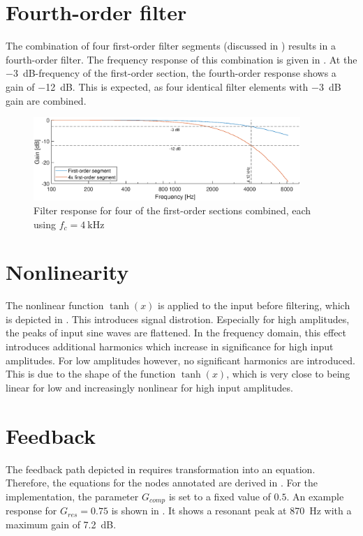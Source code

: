 \documentclass[a4paper, 12pt]{article}
\begin{document}
\section{Fourth-order filter} \label{sec:fourth-order}
The combination of four first-order filter segments (discussed in ) results in a fourth-order filter. The frequency response of this combination is given in . At the \SI{-3}{\deci\bel}-frequency of the first-order section, the fourth-order response shows a gain of \SI{-12}{\deci\bel}. This is expected, as four identical filter elements with \SI{-3}{\deci\bel} gain are combined.

\begin{figure}[!h]
	\centering
	\includegraphics[width=0.9\textwidth]{fourthorder-response.eps}
	\caption{Filter response for four of the first-order sections combined, each using $f_c = \SI{4}{\kilo\hertz}$}
	\label{fig:fourth-order-resp}
\end{figure}

\section{Nonlinearity}
The nonlinear function $\tanh(x)$ is applied \cite{Huovilainen2004} to the input before filtering, which is depicted in . This introduces signal distrotion. Especially for high amplitudes, the peaks of input sine waves are flattened. In the frequency domain, this effect introduces additional harmonics which increase in significance for high input amplitudes. For low amplitudes however, no significant harmonics are introduced. This is due to the shape of the function $\tanh(x)$, which is very close to being linear for low and increasingly nonlinear for high input amplitudes.

\section{Feedback}
The feedback path depicted in  requires transformation into an equation. Therefore, the equations for the nodes annotated are derived in . For the implementation, the parameter $G_{comp}$ is set to a fixed value of $0.5$. An example response for $G_{res}=0.75$ is shown in . It shows a resonant peak at \SI{870}{\hertz} with a maximum gain of \SI{7.2}{\deci\bel}.
\end{document}

